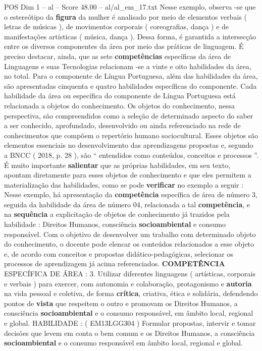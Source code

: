 \begin{textsample}{POS Dim 1 – al – Score 48.00 – al/al\_em\_17.txt}
Nesse exemplo, observa -se que o estereótipo da \textbf{figura} da mulher é analisado por meio de elementos verbais ( letras de músicas ), de movimentos corporais ( coreografias, dança ) e de manifestações artísticas ( música, dança ).
Dessa forma, é garantida a intersecção entre os diversos componentes da área por meio das práticas de linguagem.
É preciso destacar, ainda, que as sete \textbf{competências} específicas da área de Linguagens e suas Tecnologias relacionam -se a vinte e oito habilidades da área, no total.
Para o componente de Língua Portuguesa, além das habilidades da área, são apresentadas cinquenta e quatro habilidades específicas do componente.
Cada habilidade da área ou específica do componente de Língua Portuguesa está relacionada a objetos do conhecimento.
Os objetos do conhecimento, nessa perspectiva, são compreendidos como a seleção de determinado aspecto do saber a ser conhecido, aprofundado, desenvolvido ou ainda referenciado na rede de conhecimentos que compõem o repertório humano sociocultural.
Esses objetos são elementos essenciais no desenvolvimento das aprendizagens propostas e, segundo a BNCC ( 2018, p. 28 ), são “ entendidos como conteúdos, conceitos e processos ”.
É muito importante \textbf{salientar} que as próprias habilidades, em seu texto, apontam diretamente para esses objetos de conhecimento e que eles permitem a materialização das habilidades, como se pode \textbf{verificar} no exemplo a seguir : Nesse exemplo, há apresentação da \textbf{competência} específica de área de número 3, seguida da habilidade da área de número 04, relacionada a tal \textbf{competência}, e na \textbf{sequência} a explicitação de objetos de conhecimento já trazidos pela habilidade : Direitos Humanos, consciência \textbf{socioambiental} e consumo responsável.
Com o objetivo de desenvolver um trabalho com determinado objeto do conhecimento, o docente pode elencar os conteúdos relacionados a esse objeto e, de acordo com conceitos e propostas didático-pedagógicas, selecionar os processos de aprendizagem já acima referenciados. \textbf{COMPETÊNCIA} ESPECÍFICA DE ÁREA : 3.
Utilizar diferentes linguagens ( artísticas, corporais e verbais ) para exercer, com autonomia e colaboração, protagonismo e \textbf{autoria} na vida pessoal e coletiva, de forma \textbf{crítica}, criativa, ética e solidária, defendendo pontos de \textbf{vista} que respeitem o outro e promovam os Direitos Humanos, a consciência \textbf{socioambiental} e o consumo responsável, em âmbito local, regional e global.
HABILIDADE : ( EM13LGG304 ) Formular propostas, intervir e tomar decisões que levem em conta o bem comum e os Direitos Humanos, a consciência \textbf{socioambiental} e o consumo responsável em âmbito local, regional e global.

\end{textsample}
